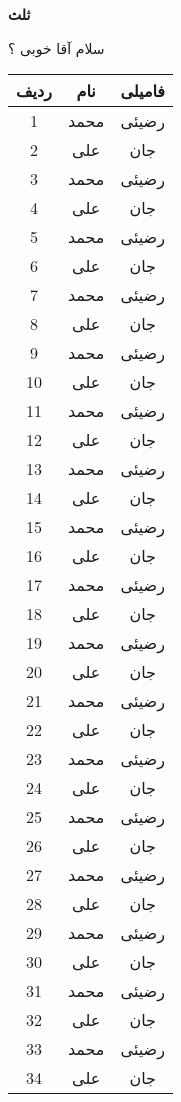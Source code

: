 \documentclass[12pt]{book}
\begin{document}
{\bf\sols
ثلث


سلام آقا خوبی ؟
}
\sols
\begin{center}
\begin{longtable}{ | c | c | c | }
	\hline 
	\textbf{ردیف} & \textbf{نام}	 &  \textbf{فامیلی}   \\ \hline 
	1 & محمد  & رضیئی \\ \hline
	2 & علی & جان \\ \hline
	3 & محمد  & رضیئی \\ \hline
	4 & علی & جان \\ \hline
	5 & محمد  & رضیئی \\ \hline
	6 & علی & جان \\ \hline
	7 & محمد  & رضیئی \\ \hline
	8 & علی & جان \\ \hline
	9 & محمد  & رضیئی \\ \hline
	10 & علی & جان \\ \hline
	11 & محمد  & رضیئی \\ \hline
	12 & علی & جان \\ \hline
	13 & محمد  & رضیئی \\ \hline
	14 & علی & جان \\ \hline
	15 & محمد  & رضیئی \\ \hline
	16 & علی & جان \\ \hline
	17 & محمد  & رضیئی \\ \hline
	18 & علی & جان \\ \hline
	19 & محمد  & رضیئی \\ \hline
	20 & علی & جان \\ \hline
	21 & محمد  & رضیئی \\ \hline
	22 & علی & جان \\ \hline
	23 & محمد  & رضیئی \\ \hline
	24 & علی & جان \\ \hline
	25 & محمد  & رضیئی \\ \hline
	26 & علی & جان \\ \hline
	27 & محمد  & رضیئی \\ \hline
	28 & علی & جان \\ \hline
	29 & محمد  & رضیئی \\ \hline
	30 & علی & جان \\ \hline
	31 & محمد  & رضیئی \\ \hline
	32 & علی & جان \\ \hline
	33 & محمد  & رضیئی \\ \hline
	34 & علی & جان \\ \hline

\end{longtable}
\end{center}
\end{document}
